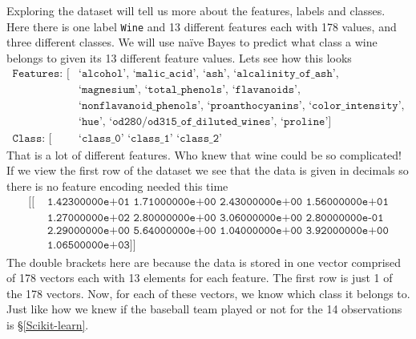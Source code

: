 \documentclass[12pt,twoside]{report}   %
\begin{document}
Exploring the dataset will tell us more about the features, labels and classes. Here there is one label \colorbox{codegrey}{\texttt{Wine}} and 13 different features each with 178 values, and three different classes. We will use na\"{i}ve Bayes to predict what class a wine belongs to given its 13 different feature values. Lets see how this looks
\begin{align*}
\texttt{Features: [}&\texttt{`alcohol', `malic\_acid', `ash', `alcalinity\_of\_ash',}\\
&\texttt{`magnesium', `total\_phenols', `flavanoids',}\\
&\texttt{`nonflavanoid\_phenols', `proanthocyanins', `color\_intensity',}\\
&\texttt{`hue', `od280/od315\_of\_diluted\_wines', `proline']}\\
\texttt{Class: [}&\texttt{`class\_0' `class\_1' `class\_2'}
\end{align*}
That is a lot of different features. Who knew that wine could be so complicated! If we view the first row of the dataset we see that the data is given in decimals so there is no feature encoding needed this time
\begin{align*}
\texttt{[[ }&\texttt{1.42300000e+01  1.71000000e+00  2.43000000e+00  1.56000000e+01}\\
&\texttt{1.27000000e+02   2.80000000e+00   3.06000000e+00   2.80000000e-01}\\
&\texttt{2.29000000e+00   5.64000000e+00   1.04000000e+00   3.92000000e+00}\\
&\texttt{1.06500000e+03]]}
\end{align*}
The double brackets here are because the data is stored in one vector comprised of 178 vectors each with 13 elements for each feature. The first row is just 1 of the 178 vectors. Now, for each of these vectors, we know which class it belongs to. Just like how we knew if the baseball team played or not for the 14 observations is \S\ref{Scikit-learn}.
\end{document}
